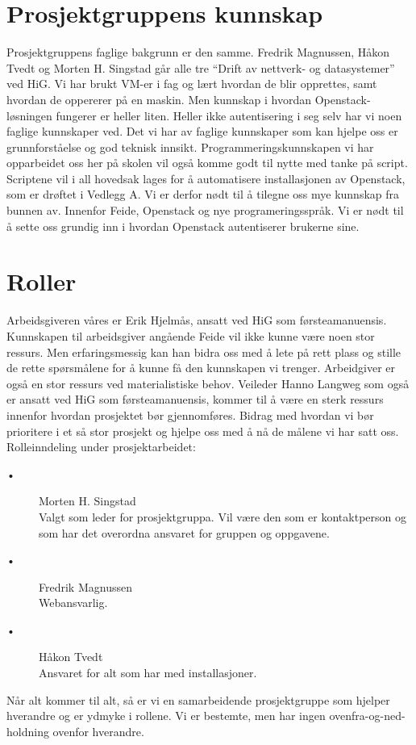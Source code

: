\section{Prosjektgruppens kunnskap}
Prosjektgruppens faglige bakgrunn er den samme. Fredrik Magnussen, Håkon Tvedt og Morten H. Singstad går alle tre “Drift av nettverk- og datasystemer” ved HiG. Vi har brukt VM-er i fag og lært hvordan de blir opprettes, samt hvordan de oppererer på en maskin. Men kunnskap i hvordan Openstack-løsningen fungerer er heller liten. Heller ikke autentisering i seg selv har vi noen faglige kunnskaper ved.\newline \newline
Det vi har av faglige kunnskaper som kan hjelpe oss er grunnforståelse og god teknisk innsikt. Programmeringskunnskapen vi har opparbeidet oss her på skolen vil også komme godt til nytte med tanke på script. Scriptene vil i all hovedsak lages for å automatisere installasjonen av Openstack, som er drøftet i Vedlegg A. \newline \newline
Vi er derfor nødt til å tilegne oss mye kunnskap fra bunnen av. Innenfor Feide, Openstack og nye programeringsspråk. Vi er nødt til å sette oss grundig inn i hvordan Openstack autentiserer brukerne sine.

\section{Roller}
Arbeidsgiveren våres er Erik Hjelmås, ansatt ved HiG som førsteamanuensis. Kunnskapen til arbeidsgiver angående Feide vil ikke kunne være noen stor ressurs. Men erfaringsmessig kan han bidra oss med å lete på rett plass og stille de rette spørsmålene for å kunne få den kunnskapen vi trenger. Arbeidgiver er også en stor ressurs ved materialistiske behov. \newline \newline
Veileder Hanno Langweg som også er ansatt ved HiG som førsteamanuensis, kommer til å være en sterk ressurs innenfor hvordan prosjektet bør gjennomføres. Bidrag med hvordan vi bør prioritere i et så stor prosjekt og hjelpe oss med å nå de målene vi har satt oss. \newline \newline
Rolleinndeling under prosjektarbeidet:
\begin{description}
\item[\tab •] Morten H. Singstad \\ Valgt som leder for prosjektgruppa. Vil være den som er kontaktperson og som har det overordna ansvaret for gruppen og oppgavene.
\item[\tab •] Fredrik Magnussen \\ Webansvarlig.
\item[\tab •] Håkon Tvedt \\ Ansvaret for alt som har med installasjoner.
\end{description}
Når alt kommer til alt, så er vi en samarbeidende prosjektgruppe som hjelper hverandre og er ydmyke i rollene. Vi er bestemte, men har ingen ovenfra-og-ned-holdning ovenfor hverandre.